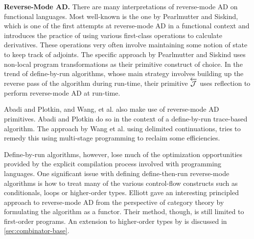 \textbf{Reverse-Mode AD.} There are many interpretations of reverse-mode AD on functional languages.
Most well-known is the one by Pearlmutter and Siskind\cite{PearlmutterSiskind2008}, which is one of the first attempts at reverse-mode AD in a functional context and introduces the practice of using various first-class operations to calculate derivatives.
These operations very often involve maintaining some notion of state to keep track of adjoints.
The specific approach by Pearlmutter and Siskind uses non-local program transformations as their primitive construct of choice.
In the trend of define-by-run algorithms, whose main strategy involves building up the reverse pass of the algorithm during run-time, their primitive $\overleftarrow{\mathcal{J}}$ uses reflection to perform reverse-mode AD at run-time.

Abadi and Plotkin\cite{10.1145/3371106}, and Wang, et al.\cite{ShiftReset:Backprop} also make use of reverse-mode AD primitives.
Abadi and Plotkin do so in the context of a define-by-run trace-based algorithm.
The approach by Wang et al. using delimited continuations, tries to remedy this using multi-stage programming to reclaim some efficiencies.

Define-by-run algorithms, however, lose much of the optimization opportunities provided by the explicit compilation process involved with programming languages.
One significant issue with defining define-then-run reverse-mode algorithms is how to treat many of the various control-flow constructs such as conditionals, loops or higher-order types.
Elliott\cite{Elliott-2018-ad-icfp} gave an interesting principled approach to reverse-mode AD from the perspective of category theory by formulating the algorithm as a functor.
Their method, though, is still limited to first-order programs.
An extension to higher-order types by \Vakar{}\cite{vkr2020reverse} is discussed in \cref{sec:combinator-base}.


